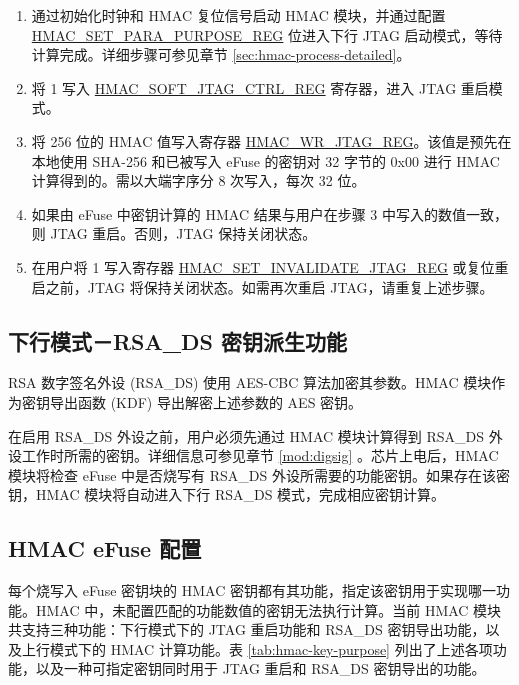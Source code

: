 \documentclass[main\_\_CN.tex]{subfiles}
\begin{document}
\begin{enumerate}
    \item 通过初始化时钟和 HMAC 复位信号启动 HMAC 模块，并通过配置 \hyperref[regdesc:HMACSETPARAPURPOSEREG]{HMAC\_SET\_PARA\_PURPOSE\_REG} 位进入下行 JTAG 启动模式，等待计算完成。详细步骤可参见章节 \ref{sec:hmac-process-detailed}。
    \item 将 1 写入 \hyperref[regdesc:HMACSOFTJTAGCTRLREG]{HMAC\_SOFT\_JTAG\_CTRL\_REG} 寄存器，进入 JTAG 重启模式。
    \item 将 256 位的 HMAC 值写入寄存器 \hyperref[regdesc:HMACWRJTAGREG]{HMAC\_WR\_JTAG\_REG}。该值是预先在本地使用 SHA-256 和已被写入 eFuse 的密钥对 32 字节的 0x00 进行 HMAC 计算得到的。需以大端字序分 8 次写入，每次 32 位。
    \item 如果由 eFuse 中密钥计算的 HMAC 结果与用户在步骤 3 中写入的数值一致，则 JTAG 重启。否则，JTAG 保持关闭状态。
    \item 在用户将 1 写入寄存器 \hyperref[regdesc:HMACSETINVALIDATEJTAGREG]{HMAC\_SET\_INVALIDATE\_JTAG\_REG} 或复位重启之前，JTAG 将保持关闭状态。如需再次重启 JTAG，请重复上述步骤。
    \end{enumerate}


\subsection{下行模式－RSA\_DS 密钥派生功能}

RSA 数字签名外设 (RSA\_DS) 使用 AES-CBC 算法加密其参数。HMAC 模块作为密钥导出函数 (KDF) 导出解密上述参数的 AES 密钥。

在启用 RSA\_DS 外设之前，用户必须先通过 HMAC 模块计算得到 RSA\_DS 外设工作时所需的密钥。详细信息可参见章节 \ref{mod:digsig} \textit{}。芯片上电后，HMAC 模块将检查 eFuse 中是否烧写有 RSA\_DS 外设所需要的功能密钥。如果存在该密钥，HMAC 模块将自动进入下行 RSA\_DS 模式，完成相应密钥计算。

\subsection{HMAC eFuse 配置}
\label{sec:hmac-config-function}

每个烧写入 eFuse 密钥块的 HMAC 密钥都有其功能，指定该密钥用于实现哪一功能。HMAC 中，未配置匹配的功能数值的密钥无法执行计算。当前 HMAC 模块共支持三种功能：下行模式下的 JTAG 重启功能和 RSA\_DS 密钥导出功能，以及上行模式下的 HMAC 计算功能。表 \ref{tab:hmac-key-purpose} 列出了上述各项功能，以及一种可指定密钥同时用于 JTAG 重启和 RSA\_DS 密钥导出的功能。
\end{document}

